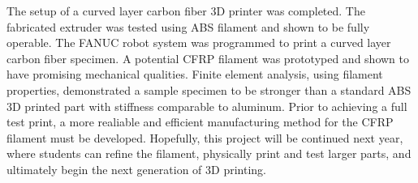 
The setup of a curved layer carbon fiber 3D printer was completed. The fabricated extruder was tested using ABS filament and shown to be fully operable. The FANUC robot system was programmed to print a curved layer carbon fiber specimen. A potential CFRP filament was prototyped and shown to have promising mechanical qualities. Finite element analysis, using filament properties, demonstrated a sample specimen to be stronger than a standard ABS 3D printed part with stiffness comparable to aluminum. Prior to achieving a full test print, a more realiable and efficient manufacturing method for the CFRP filament must be developed. Hopefully, this project will be continued next year, where students can refine the filament, physically print and test larger parts, and ultimately begin the next generation of 3D printing.